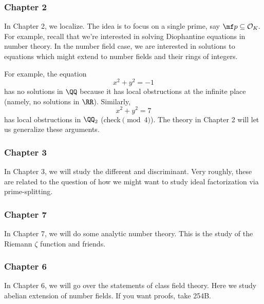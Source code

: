 \subsubsection{Chapter 2}
In Chapter 2, we localize. The idea is to focus on a single prime, say $\mf p\subseteq\mathcal O_K.$ For example, recall that we're interested in solving Diophantine equations in number theory. In the number field case, we are interested in solutions to equations which might extend to number fields and their rings of integers.

For example, the equation
\[x^2+y^2=-1\]
has no solutions in $\QQ$ because it has local obstructions at the infinite place (namely, no solutions in $\RR$). Similarly,
\[x^2+y^2=7\]
has local obstructions in $\QQ_2$ (check$\pmod4$). The theory in Chapter 2 will let us generalize these arguments.

\subsubsection{Chapter 3}
In Chapter 3, we will study the different and discriminant. Very roughly, these are related to the question of how we might want to study ideal factorization via prime-splitting.

\subsubsection{Chapter 7}
In Chapter 7, we will do some analytic number theory. This is the study of the Riemann $\zeta$ function and friends.

\subsubsection{Chapter 6}
In Chapter 6, we will go over the statements of class field theory. Here we study abelian extension of number fields. If you want proofs, take 254B.


